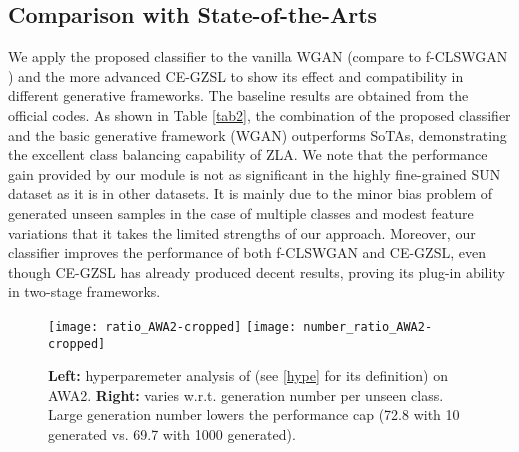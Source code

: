 \documentclass{article}
\begin{document}
	\subsection{Comparison with State-of-the-Arts}
We apply the proposed classifier to the vanilla WGAN (compare to f-CLSWGAN \cite{xian2018feature}) and the more advanced CE-GZSL \cite{han2021contrastive} to show its effect and compatibility in different generative frameworks. The baseline results are obtained from the official codes. As shown in Table \ref{tab2}, the combination of the proposed classifier and the basic generative framework (WGAN) outperforms SoTAs, demonstrating the excellent class balancing capability of ZLA. We note that the performance gain provided by our module is not as significant in the highly fine-grained SUN dataset as it is in other datasets. It is mainly due to the minor bias problem of generated unseen samples in the case of multiple classes and modest feature variations that it takes the limited strengths of our approach. Moreover, our classifier improves the performance of both f-CLSWGAN and CE-GZSL, even though CE-GZSL has already produced decent results, proving its plug-in ability in two-stage frameworks.
       \begin{figure}[t]
		\centering
		\subfigure 
		{
			\texttt{[image: ratio\_AWA2-cropped]}
		}
        \subfigure 
		{
			\texttt{[image: number\_ratio\_AWA2-cropped]}
		}
		\vspace{-2.9ex}
		\caption{{\bf Left:} hyperparemeter analysis of  (see \ref{hype} for its definition) on AWA2. {\bf Right:}  varies w.r.t. generation number per unseen class. Large generation number lowers the performance cap (72.8 with 10 generated vs. 69.7 with 1000 generated).}
		\vspace{-2ex}
		\label{fig3}
	\end{figure}
\end{document}
